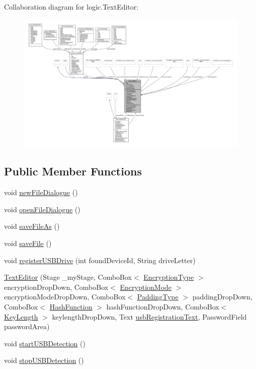 Collaboration diagram for logic.\+Text\+Editor\+:\nopagebreak
\begin{figure}[H]
\begin{center}
\leavevmode
\includegraphics[width=350pt]{classlogic_1_1_text_editor__coll__graph}
\end{center}
\end{figure}
\subsection*{Public Member Functions}
\begin{DoxyCompactItemize}
\item 
void \mbox{\hyperlink{classlogic_1_1_text_editor_aad7f5f3f95ab498ee16d09f0f198c0c9}{new\+File\+Dialogue}} ()
\item 
void \mbox{\hyperlink{classlogic_1_1_text_editor_ae6690cbd84b9162df386bb319690a810}{open\+File\+Dialogue}} ()
\item 
void \mbox{\hyperlink{classlogic_1_1_text_editor_a0581e73a9b3b6ae54a8e69de49fb9ed5}{save\+File\+As}} ()
\item 
void \mbox{\hyperlink{classlogic_1_1_text_editor_ae11be4a147a095ce667576ce50f210b2}{save\+File}} ()
\item 
void \mbox{\hyperlink{classlogic_1_1_text_editor_aeb8b26927002020f35d2dc6cc8ececfe}{register\+U\+S\+B\+Drive}} (int found\+Device\+Id, String drive\+Letter)
\item 
\mbox{\hyperlink{classlogic_1_1_text_editor_a1ee7c49f953dac5de4dfbd8e8c350e76}{Text\+Editor}} (Stage \+\_\+my\+Stage, Combo\+Box$<$ \mbox{\hyperlink{enumenums_1_1_encryption_type}{Encryption\+Type}} $>$ encryption\+Drop\+Down, Combo\+Box$<$ \mbox{\hyperlink{enumenums_1_1_encryption_mode}{Encryption\+Mode}} $>$ encryption\+Mode\+Drop\+Down, Combo\+Box$<$ \mbox{\hyperlink{enumenums_1_1_padding_type}{Padding\+Type}} $>$ padding\+Drop\+Down, Combo\+Box$<$ \mbox{\hyperlink{enumenums_1_1_hash_function}{Hash\+Function}} $>$ hash\+Function\+Drop\+Down, Combo\+Box$<$ \mbox{\hyperlink{enumenums_1_1_key_length}{Key\+Length}} $>$ keylength\+Drop\+Down, Text \mbox{\hyperlink{classlogic_1_1_text_editor_ac75c41480833a18c2cfd0f569cf10a45}{usb\+Registration\+Text}}, Password\+Field password\+Area)
\item 
void \mbox{\hyperlink{classlogic_1_1_text_editor_a2f6a603d1650e3a718598a46c64c3c6d}{start\+U\+S\+B\+Detection}} ()
\item 
void \mbox{\hyperlink{classlogic_1_1_text_editor_a6f0bfd6368a5cb94a2b0fe8699892772}{stop\+U\+S\+B\+Detection}} ()
\end{DoxyCompactItemize}
